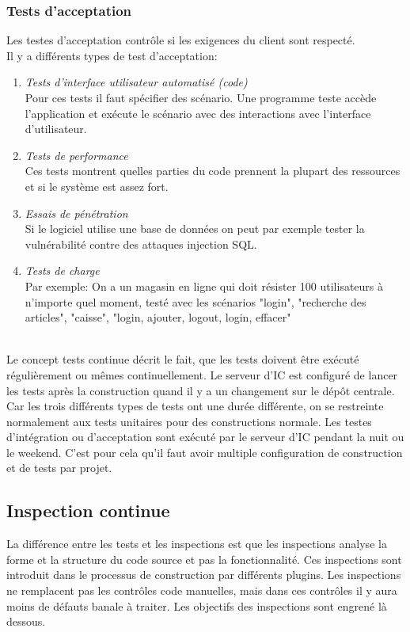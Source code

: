 \subsubsection{Tests d'acceptation}
Les testes d'acceptation contrôle si les exigences du client sont respecté. \\
Il y a différents types de test d'acceptation:
\begin{enumerate}
 \item \textit{Tests d'interface utilisateur automatisé (code)}
 \\Pour ces tests il faut spécifier des scénario. Une programme teste accède l'application et exécute le scénario avec des interactions avec l'interface d'utilisateur.
 \item \textit{Tests de performance}
 \\Ces tests montrent quelles parties du code prennent la plupart des ressources et si le système est assez fort.
 \item \textit{Essais de pénétration}
 \\Si le logiciel utilise une base de données on peut par exemple tester la vulnérabilité contre des attaques injection SQL.
 \item \textit{Tests de charge}
 \\Par exemple: On a un magasin en ligne qui doit résister 100 utilisateurs à n'importe quel moment, testé avec les scénarios "login", "recherche des articles", "caisse", "login, ajouter, logout, login, effacer"
\end{enumerate}
\ \\
Le concept tests continue décrit le fait, que les tests doivent être exécuté régulièrement ou mêmes continuellement. Le serveur d'IC est configuré de lancer les tests après la construction quand il y a un changement sur le dépôt centrale. Car les trois différents types de tests ont une durée différente, on se restreinte normalement aux tests unitaires pour des constructions normale. Les testes d'intégration ou d'acceptation sont exécuté par le serveur d'IC pendant la nuit ou le weekend. C'est pour cela qu'il faut avoir multiple configuration de construction et de tests par projet.
\newpage

\subsection{Inspection continue}

La différence entre les tests et les inspections est que les inspections analyse la forme et la structure du code source et pas la fonctionnalité. Ces inspections sont introduit dans le processus de construction par différents plugins. Les inspections ne remplacent pas les contrôles code manuelles, mais dans ces contrôles il y aura moins de défauts banale à traiter. Les objectifs des inspections sont engrené là dessous.

